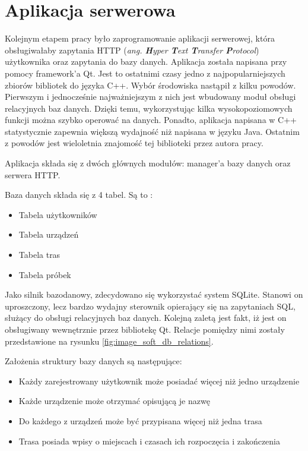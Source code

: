 \section{Aplikacja serwerowa}

Kolejnym etapem pracy było zaprogramowanie aplikacji serwerowej, która obsługiwałaby zapytania HTTP (\textit{ang. \textbf{H}yper \textbf{T}ext \textbf{T}ransfer \textbf{P}rotocol}) użytkownika oraz zapytania do bazy danych. Aplikacja została napisana przy pomocy framework'a Qt. Jest to ostatnimi czasy jedno z najpopularniejszych zbiorów bibliotek do języka C++. Wybór środowiska nastąpił z kilku powodów. Pierwszym i jednocześnie najważniejszym z nich jest wbudowany moduł obsługi relacyjnych baz danych. Dzięki temu, wykorzystując kilka wysokopoziomowych funkcji można szybko operować na danych. Ponadto, aplikacja napisana w C++ statystycznie zapewnia większą wydajność niż napisana w języku Java. Ostatnim z powodów jest wieloletnia znajomość tej biblioteki przez autora pracy.

Aplikacja składa się z dwóch głównych modułów: manager'a bazy danych oraz serwera HTTP.

Baza danych składa się z 4 tabel. Są to :

\begin{itemize}
\item Tabela użytkowników
\item Tabela urządzeń
\item Tabela tras
\item Tabela próbek
\end{itemize}

Jako silnik bazodanowy, zdecydowano się wykorzystać system SQLite. Stanowi on uproszczony, lecz bardzo wydajny sterownik opierający się na zapytaniach SQL, służący do obsługi relacyjnych baz danych. Kolejną zaletą jest fakt, iż jest on obsługiwany wewnętrznie przez bibliotekę Qt.
Relacje pomiędzy nimi zostały przedstawione na rysunku \ref{fig:image_soft_db_relations}.

Założenia struktury bazy danych są następujące:

\begin{itemize}
\item Każdy zarejestrowany użytkownik może posiadać więcej niż jedno urządzenie
\item Każde urządzenie może otrzymać opisującą je nazwę
\item Do każdego z urządzeń może być przypisana więcej niż jedna trasa
\item Trasa posiada wpisy o miejscach i czasach ich rozpoczęcia i zakończenia
\end{itemize}

